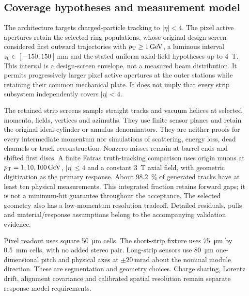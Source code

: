 \subsection{Coverage hypotheses and measurement model}
The architecture targets charged-particle tracking to $|\eta|<4$. The pixel
active apertures retain the selected ring populations, whose original design
screen considered first outward trajectories with
$p_{\mathrm{T}}\geq\qty{1}{\giga\electronvolt}$, a luminous interval
$z_0\in[-150,150]\,\unit{\milli\metre}$ and the stated uniform axial-field
hypotheses up to \qty{4}{\tesla}. This interval is a design-screen envelope,
not a measured beam distribution. It permits progressively larger pixel active
apertures at the outer stations while retaining their common mechanical plate.
It does not imply that every strip subsystem independently covers $|\eta|<4$.

The retained strip screens sample straight tracks and vacuum helices at selected
momenta, fields, vertices and azimuths. They use finite sensor planes and retain
the original ideal-cylinder or annulus denominators. They are neither proofs
for every intermediate momentum nor simulations of scattering, energy loss,
dead channels or track reconstruction. Nonzero misses remain at barrel ends and
shifted first discs. A finite Fatras truth-tracking comparison uses origin muons at
$\pt=1,10,100\,\unit{\giga\electronvolt}$, $|\eta|\leq4$ and a constant
\qty{3}{\tesla} axial field, with geometric digitization as the primary
response. About \qty{98.2}{\percent} of generated tracks have at least ten
physical measurements. This integrated fraction retains forward gaps; it is
not a minimum-hit guarantee throughout the acceptance. The selected geometry
also has a low-momentum resolution tradeoff. Detailed residuals, pulls and
material/response assumptions belong to the accompanying validation evidence.

Pixel readout uses square \qty{50}{\micro\metre} cells. The short-strip fixture
uses \qty{75}{\micro\metre} by \qty{0.5}{\milli\metre} cells, with no added
stereo pair. Long-strip sensors use \qty{80}{\micro\metre} one-dimensional
pitch and physical axes at $\pm\qty{20}{\milli\radian}$ about the nominal
module direction. These are segmentation and geometry choices. Charge sharing,
Lorentz drift, alignment covariance and calibrated spatial resolution remain
separate response-model requirements.

